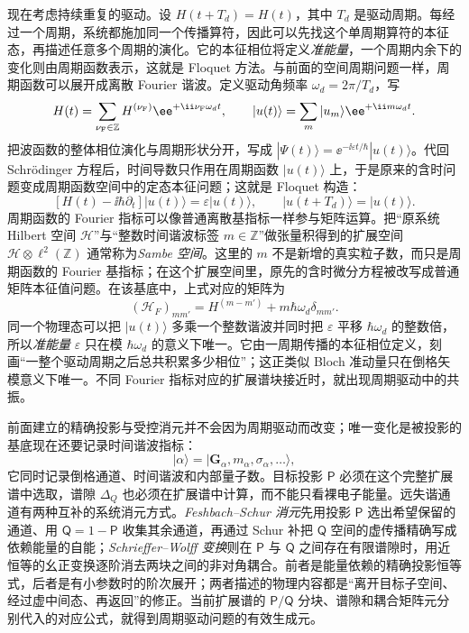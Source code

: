 现在考虑持续重复的驱动。设 $H(t+T_d)=H(t)$，其中 $T_d$ 是驱动周期。每经过一个周期，系统都施加同一个传播算符，因此可以先找这个单周期算符的本征态，再描述任意多个周期的演化。它的本征相位将定义\emph{准能量}，一个周期内余下的变化则由周期函数表示，这就是 Floquet 方法。与前面的空间周期问题一样，周期函数可以展开成离散 Fourier 谐波。定义驱动角频率 $\omega_d=2\pi/T_d$，写
\begin{equation*}
H(t)=\sum_{\nu_{\rm F}\in\mathbb Z}H^{(\nu_{\rm F})}\ee^{+\ii\nu_{\rm F}\omega_d t},
\qquad
|u(t)\rangle=\sum_m|u_m\rangle \ee^{+\ii m\omega_d t}.
\end{equation*}
把波函数的整体相位演化与周期形状分开，写成 $|\Psi(t)\rangle=\ee^{-\ii\varepsilon t/\hbar}|u(t)\rangle$。代回 Schr\"odinger 方程后，时间导数只作用在周期函数 $|u(t)\rangle$ 上，于是原来的含时问题变成周期函数空间中的定态本征问题；这就是 Floquet 构造：
\begin{equation}
\boxed{
[H(t)-\ii\hbar\partial_t]|u(t)\rangle
=\varepsilon|u(t)\rangle,
\qquad |u(t+T_d)\rangle=|u(t)\rangle.}
\label{eq:floquet_sambe_eigenproblem}
\end{equation}
周期函数的 Fourier 指标可以像普通离散基指标一样参与矩阵运算。把“原系统 Hilbert 空间 $\mathcal H$”与“整数时间谐波标签 $m\in\mathbb Z$”做张量积得到的扩展空间 $\mathcal H\otimes\ell^2(\mathbb Z)$ 通常称为\emph{Sambe 空间}。这里的 $m$ 不是新增的真实粒子数，而只是周期函数的 Fourier 基指标；在这个扩展空间里，原先的含时微分方程被改写成普通矩阵本征值问题。在该基底中，上式对应的矩阵为
\begin{equation}
\boxed{
(\mathcal H_F)_{mm'}
=H^{(m-m')}+m\hbar\omega_d\delta_{mm'}.}
\label{eq:general_floquet_sambe_operator_periodic_lattice}
\end{equation}
同一个物理态可以把 $|u(t)\rangle$ 多乘一个整数谐波并同时把 $\varepsilon$ 平移 $\hbar\omega_d$ 的整数倍，所以\emph{准能量} $\varepsilon$ 只在模 $\hbar\omega_d$ 的意义下唯一。它由一周期传播的本征相位定义，刻画“一整个驱动周期之后总共积累多少相位”；这正类似 Bloch 准动量只在倒格矢模意义下唯一。不同 Fourier 指标对应的扩展谱块接近时，就出现周期驱动中的共振。

前面建立的精确投影与受控消元并不会因为周期驱动而改变；唯一变化是被投影的基底现在还要记录时间谐波指标：
\begin{equation*}
|\alpha\rangle
=|\mathbf G_\alpha,m_\alpha,\sigma_\alpha,\ldots\rangle,
\end{equation*}
它同时记录倒格通道、时间谐波和内部量子数。目标投影 $\mathsf P$ 必须在这个完整扩展谱中选取，谱隙 $\Delta_Q$ 也必须在扩展谱中计算，而不能只看裸电子能量。远失谐通道有两种互补的系统消元方式。\emph{Feshbach--Schur 消元}先用投影 $\mathsf P$ 选出希望保留的通道、用 $\mathsf Q=1-\mathsf P$ 收集其余通道，再通过 Schur 补把 $\mathsf Q$ 空间的虚传播精确写成依赖能量的自能；\emph{Schrieffer--Wolff 变换}则在 $\mathsf P$ 与 $\mathsf Q$ 之间存在有限谱隙时，用近恒等的幺正变换逐阶消去两块之间的非对角耦合。前者是能量依赖的精确投影恒等式，后者是有小参数时的阶次展开；两者描述的物理内容都是“离开目标子空间、经过虚中间态、再返回”的修正。当前扩展谱的 $\mathsf P/\mathsf Q$ 分块、谱隙和耦合矩阵元分别代入的对应公式，就得到周期驱动问题的有效生成元。

